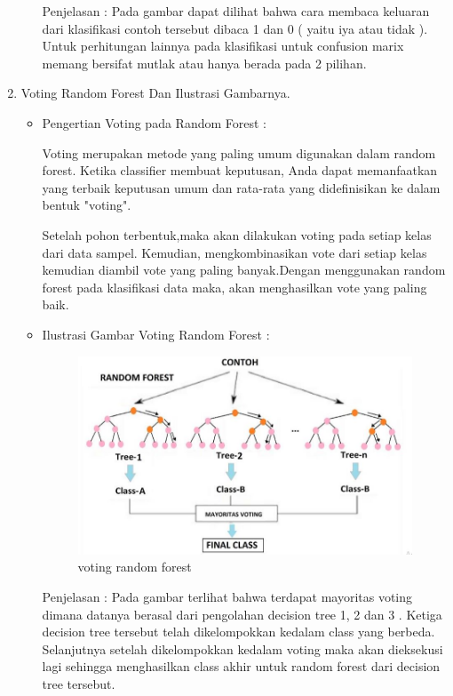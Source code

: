 \begin{enumerate}
\begin{itemize}
\par
\par Penjelasan : Pada gambar dapat dilihat bahwa cara membaca keluaran dari klasifikasi contoh tersebut dibaca 1 dan 0 ( yaitu iya atau tidak ). Untuk perhitungan lainnya pada klasifikasi untuk confusion marix memang bersifat mutlak atau hanya berada pada 2 pilihan.
\par
\par 
\end{itemize}

\par
\par
\item Voting Random Forest Dan Ilustrasi Gambarnya.
\par
\begin{itemize}
\item Pengertian Voting pada Random Forest	:
\par Voting merupakan metode yang paling umum digunakan dalam random forest. Ketika classifier membuat keputusan, Anda dapat memanfaatkan yang terbaik keputusan umum dan rata-rata yang didefinisikan ke dalam bentuk "voting".
\par Setelah pohon terbentuk,maka akan dilakukan voting pada setiap kelas dari data sampel. Kemudian, mengkombinasikan vote dari setiap kelas kemudian diambil vote yang paling banyak.Dengan menggunakan random forest pada klasifikasi data maka, akan menghasilkan vote yang paling baik.
\item Ilustrasi Gambar Voting Random Forest :
\begin{figure}[ht]
\centering
\includegraphics[scale=0.3]{figures/voting.jpg}
\caption{voting random forest}
\label{contoh}
\end{figure}
\par 
\par Penjelasan : Pada gambar terlihat bahwa terdapat mayoritas voting dimana datanya berasal dari pengolahan decision tree 1, 2 dan 3 . Ketiga decision tree tersebut telah dikelompokkan kedalam class yang berbeda. Selanjutnya setelah dikelompokkan kedalam voting maka akan dieksekusi lagi sehingga menghasilkan class akhir untuk random forest dari decision tree tersebut. 
\par
\end{itemize}
\par

\end{enumerate}


